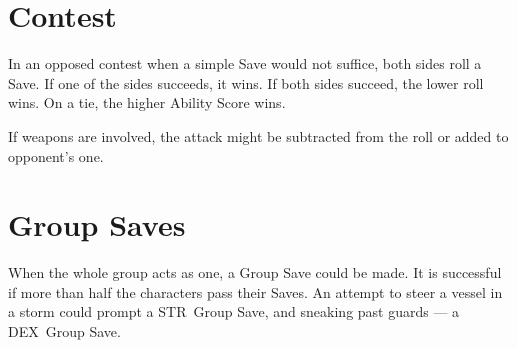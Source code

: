 \documentclass[itdr]{subfiles}
\begin{document}
\vfill

\section{Contest}
In an opposed contest when a simple Save would not suffice, both sides roll a Save. If one of the sides succeeds, it wins. If both sides succeed, the lower roll wins. On a tie, the higher Ability Score wins.

If weapons are involved, the attack might be subtracted from the roll or added to opponent's one.

\vfill

\section{Group Saves}
When the whole group acts as one, a Group Save could be made. It is successful if more than half the characters pass their Saves. An attempt to steer a vessel in a storm could prompt a STR~Group Save, and sneaking past guards --- a DEX~Group Save.

\vfill

\begin{comment}
\section{Gods, Religion, and Disciples}
\index{Religion}
\index{Disciple}
\index{Creed}

The nature of divine presence is highly dependent on a specific setting and thus is left to your discretion. Some worlds could be completely devoid of divine influence (though local cults might still have supernatural powers from some other source), while dwellers of other worlds can regularly observe their gods' interventions in the deals of mortals.

\subparagraph{Disciple} Class and its Creeds from the \textbf{\customref{ch:appendix_c}{Appendix C: Class-ic Edition}} could be used as a Feature to represent the most devoted adepts of cryptic cults. Unlike other Features, this one has a prerequisite of the character being a worshipper of the relevant set of teachings. When obtaining a new Experience Level, follow standard rules. Additionally, from Expert onwards, Disciples gain d4 (up to their WIL~/~2, rounded down) Followers (3hp, Simple Weapon) each time they visit a friendly settlement  and are responsible for their food, shelter, equipment, etc.
\end{comment}
\end{document}
